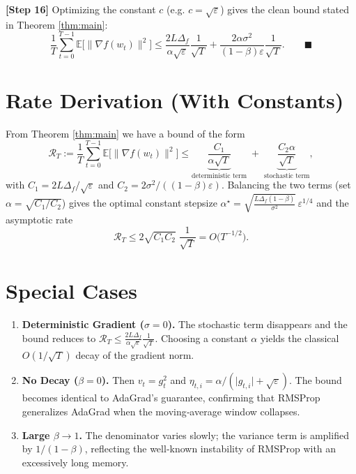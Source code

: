 \documentclass{article}
\newcommand{\E}{\mathbb{E}}
\begin{document}
\noindent\textbf{[Step 16]} Optimizing the constant $c$ (e.g. $c= \sqrt{\varepsilon}$) gives the clean bound stated in Theorem \ref{thm:main}:
\[
\frac{1}{T}\sum_{t=0}^{T-1}\E\!\big[\|\nabla f(w_t)\|^2\big]
\le
\frac{2L\Delta_f}{\alpha\sqrt{\varepsilon}}\frac{1}{\sqrt{T}}
   +\frac{2\alpha\sigma^2}{(1-\beta)\varepsilon}\frac{1}{\sqrt{T}} .
\qquad\blacksquare
\]

\section*{Rate Derivation (With Constants)}
From Theorem \ref{thm:main} we have a bound of the form
\[
\mathcal R_T :=\frac{1}{T}\sum_{t=0}^{T-1}\E\!\big[\|\nabla f(w_t)\|^2\big]
\le
\underbrace{\frac{C_1}{\alpha\sqrt{T}}}_{\text{deterministic term}}
\;+\;
\underbrace{\frac{C_2\alpha}{\sqrt{T}}}_{\text{stochastic term}},
\]
with $C_1=2L\Delta_f/\sqrt{\varepsilon}$ and $C_2=2\sigma^2/((1-\beta)\varepsilon)$.  
Balancing the two terms (set $\alpha = \sqrt{C_1/C_2}$) gives the optimal constant stepsize
$\alpha^\star = \sqrt{\frac{L\Delta_f (1-\beta)}{\sigma^2}}\,\varepsilon^{1/4}$ and the
asymptotic rate
\[
\mathcal R_T \le 2\sqrt{C_1 C_2}\;\frac{1}{\sqrt{T}}
= O\!\big(T^{-1/2}\big).
\]

\section*{Special Cases}
\begin{enumerate}[noitemsep,topsep=0pt]
\item \textbf{Deterministic Gradient ($\sigma=0$).} The stochastic term disappears and
the bound reduces to $\mathcal R_T \le \frac{2L\Delta_f}{\alpha\sqrt{\varepsilon}}\frac{1}{\sqrt{T}}$.
Choosing a constant $\alpha$ yields the classical $O(1/\sqrt{T})$ decay of the gradient norm.
\item \textbf{No Decay ($\beta=0$).} Then $v_t = g_t^2$ and $\eta_{t,i}= \alpha/(\lvert g_{t,i}\rvert+\sqrt{\varepsilon})$.
The bound becomes identical to AdaGrad’s guarantee, confirming that RMSProp
generalizes AdaGrad when the moving‑average window collapses.
\item \textbf{Large $\beta\to1$.} The denominator varies slowly;
the variance term is amplified by $1/(1-\beta)$, reflecting the well‑known
instability of RMSProp with an excessively long memory.
\end{enumerate}
\end{document}
